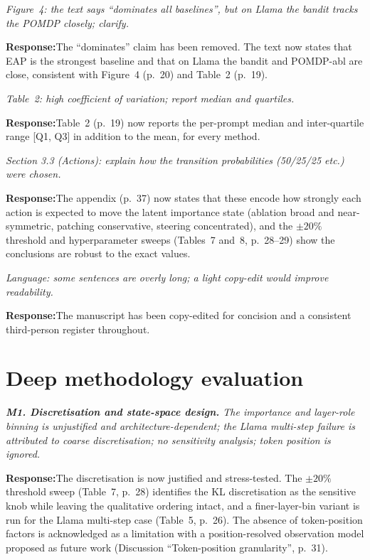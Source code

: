 \documentclass[11pt]{article}
\newenvironment{comment}{%
  \def\FrameCommand{{\color{commentrule}\vrule width 3pt}\hspace{0pt}%
    \fboxsep=8pt\colorbox{commentbg}}%
  \MakeFramed{\advance\hsize-\width\FrameRestore}%
  \itshape\small}{\endMakeFramed}
\newcommand{\response}{\par\smallskip\noindent\textbf{Response:}\;}
\begin{document}
\begin{comment}
Figure~4: the text says ``dominates all baselines'', but on Llama the bandit
tracks the POMDP closely; clarify.
\end{comment}
\response The ``dominates'' claim has been removed. The text now states that EAP
is the strongest baseline and that on Llama the bandit and POMDP-abl are close,
consistent with Figure~4 (p.~20) and Table~2 (p.~19).

\begin{comment}
Table~2: high coefficient of variation; report median and quartiles.
\end{comment}
\response Table~2 (p.~19) now reports the per-prompt median and inter-quartile
range [Q1, Q3] in addition to the mean, for every method.

\begin{comment}
Section 3.3 (Actions): explain how the transition probabilities (50/25/25 etc.)
were chosen.
\end{comment}
\response The appendix (p.~37) now states that these encode how strongly each
action is expected to move the latent importance state (ablation broad and
near-symmetric, patching conservative, steering concentrated), and the $\pm20\%$
threshold and hyperparameter sweeps (Tables~7 and~8, p.~28--29) show the conclusions
are robust to the exact values.

\begin{comment}
Language: some sentences are overly long; a light copy-edit would improve
readability.
\end{comment}
\response The manuscript has been copy-edited for concision and a consistent
third-person register throughout.

\section*{Deep methodology evaluation}

\begin{comment}
\textbf{M1. Discretisation and state-space design.} The importance and layer-role
binning is unjustified and architecture-dependent; the Llama multi-step failure is
attributed to coarse discretisation; no sensitivity analysis; token position is
ignored.
\end{comment}
\response The discretisation is now justified and stress-tested. The $\pm20\%$
threshold sweep (Table~7, p.~28) identifies the KL discretisation as the sensitive
knob while leaving the qualitative ordering intact, and a finer-layer-bin variant
is run for the Llama multi-step case (Table~5, p.~26). The absence of token-position
factors is acknowledged as a limitation with a position-resolved observation model
proposed as future work (Discussion ``Token-position granularity'', p.~31).
\end{document}
